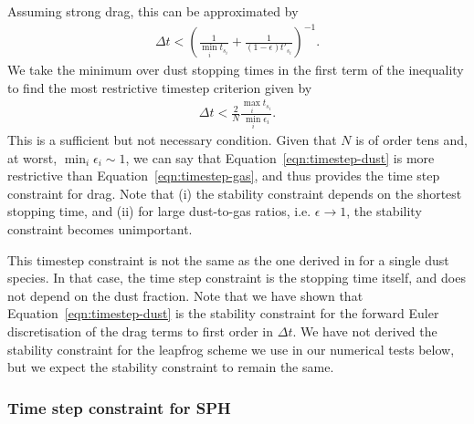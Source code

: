 \documentclass[fleqn,usenatbib]{mnras}
\begin{document}
%
Assuming strong drag, this can be approximated by
%
\begin{align}
   \Delta t < \left( \frac{1}{\min_i t_{s_i}}
      + \frac{1}{(1 - \epsilon) t'_{s_i}} \right)^{-1}.
\end{align}
%
We take the minimum over dust stopping times in the first term of the inequality
to find the most restrictive timestep criterion given by
%
\begin{align}
   \label{eqn:timestep-gas}
   \Delta t < \frac{2}{N} \frac{\max_i t_{s_i}}{\min_i \epsilon_i}.
\end{align}
%
This is a sufficient but not necessary condition. Given that \(N\) is of order
tens and, at worst, \(\min_i \epsilon_i \sim 1\), we can say that
Equation~\ref{eqn:timestep-dust} is more restrictive than
Equation~\ref{eqn:timestep-gas}, and thus provides the time step constraint for
drag. Note that (i) the stability constraint depends on the shortest stopping
time, and (ii) for large dust-to-gas ratios, i.e. \(\epsilon \rightarrow 1\),
the stability constraint becomes unimportant.

This timestep constraint is not the same as the one derived in
\citet{Laibe2012MNRAS.420.2345L} for a single dust species. In that case, the
time step constraint is the stopping time itself, and does not depend on the
dust fraction. Note that we have shown that Equation~\ref{eqn:timestep-dust} is
the stability constraint for the forward Euler discretisation of the drag terms
to first order in \(\Delta t\). We have not derived the stability constraint for
the leapfrog scheme we use in our numerical tests below, but we expect the
stability constraint to remain the same.

\subsubsection{Time step constraint for SPH}
\end{document}
